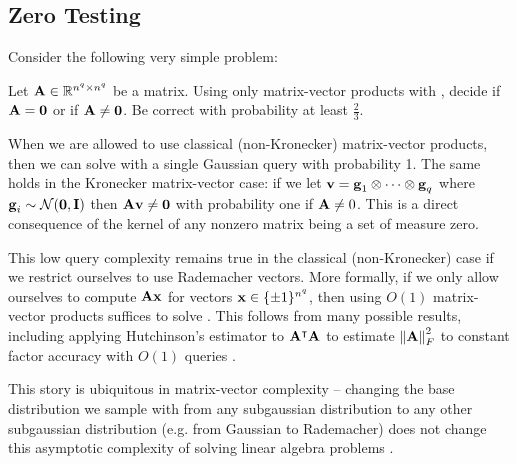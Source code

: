 

\subsection{Zero Testing}

Consider the following very simple problem:

\begin{problem}
	\label{prob:zero-testing}
	Let \(\mathbf{A}\in{\mathbb R}^{n^q \times n^q}\) be a matrix.
	Using only matrix-vector products with \mA, decide if \(\mathbf{A} = \mathbf{0}\) or if \(\mathbf{A} \neq \mathbf{0}\).
	Be correct with probability at least \(\frac23\).
\end{problem}

When we are allowed to use classical (non-Kronecker) matrix-vector products, then we can solve  with a single Gaussian query with probability 1.
The same holds in the Kronecker matrix-vector case:
if we let \(\boldsymbol{\mathrm{v}} = \boldsymbol{\mathrm{g}}_1 \otimes \cdots \otimes \boldsymbol{\mathrm{g}}_q\) where \(\boldsymbol{\mathrm{g}}_i \sim {\mathcal N}(\boldsymbol{\mathrm{0}},\mathbf{I})\) then \(\mathbf{A}\boldsymbol{\mathrm{v}} \neq \boldsymbol{\mathrm{0}}\) with probability one if \(\mathbf{A} \neq 0\).
This is a direct consequence of the kernel of any nonzero matrix being a set of measure zero.

This low query complexity remains true in the classical (non-Kronecker) case if we restrict ourselves to use Rademacher vectors.
More formally, if we only allow ourselves to compute \(\mathbf{A}\boldsymbol{\mathrm{x}}\) for vectors \(\boldsymbol{\mathrm{x}}\in\{\pm1\}^{n^q}\), then using \(O(1)\) matrix-vector products suffices to solve .
This follows from many possible results, including applying Hutchinson's estimator to \(\mathbf{A}^\intercal\mathbf{A}\) to estimate \(\norm{\mA}_F^2\) to constant factor accuracy with \(O(1)\) queries \cite{meyer2023hutchinson}.

This story is ubiquitous in matrix-vector complexity -- changing the base distribution we sample with from any subgaussian distribution to any other subgaussian distribution (e.g. from Gaussian to Rademacher) does not change this asymptotic complexity of solving linear algebra problems \cite{saibaba2025randomized,meyer21hutchpp}.

